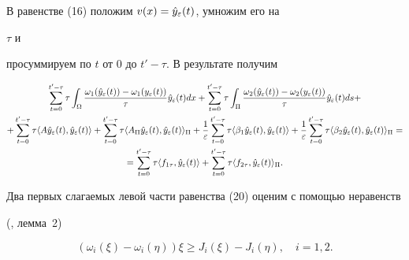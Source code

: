 % 


\begin{pf} 


В равенстве (16) положим $v(x)=\Hat y_\varepsilon(t)$, умножим его на 


$\tau$ и 


просуммируем по $t$ от 0 до $t'-\tau$. В результате получим 


\begin{gather} 


\sum^{t'-\tau}_{t=0}\tau\int_\Omega 


\frac{\omega_1(\Hat y_\varepsilon(t))-\omega_1(y_\varepsilon(t))} 


{\tau} \Hat y_\varepsilon(t)dx+


\sum^{t'-\tau}_{t=0}\tau\int_\Pi 


\frac{\omega_2(\Hat y_\varepsilon(t))-\omega_2(y_\varepsilon(t))} 


{\tau} \Hat y_\varepsilon(t)ds+\notag \\ 


+ \sum^{t'-\tau}_{t=0}\tau\langle A\Hat y_\varepsilon(t), 


\Hat y_\varepsilon(t)\rangle + 


\sum^{t'-\tau}_{t=0}\tau\langle A_\Pi \Hat y_\varepsilon(t), 


\Hat y_\varepsilon(t)\rangle_\Pi +


\frac{1}{\varepsilon} 


\sum^{t'-\tau}_{t=0}\tau\langle \beta_1 \Hat y_\varepsilon(t), 


\Hat y_\varepsilon(t)\rangle +


\frac{1}{\varepsilon} 


\sum^{t'-\tau}_{t=0}\tau\langle \beta_2 \Hat y_\varepsilon(t), 


\Hat y_\varepsilon(t)\rangle_\Pi =\notag\\ 


=\sum^{t'-\tau}_{t=0}\tau\langle f_{1\tau}, \Hat y_\varepsilon(t)\rangle + 


\sum^{t'-\tau}_{t=0}\tau\langle f_{2\tau}, \Hat y_\varepsilon(t)\rangle_\Pi.


\end{gather} 


Два первых слагаемых левой части равенства (20) оценим с помощью неравенств 


(\cite{Pav}, лемма~2) 


\begin{equation} 


(\omega_i(\xi)-\omega_i(\eta))\xi \ge J_i(\xi)-J_i(\eta), \quad i=1,2. 



\end{equation}
\end{pf}
